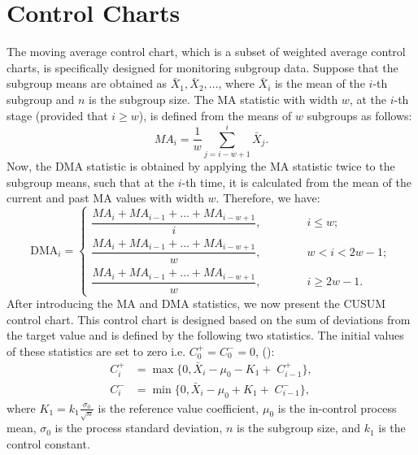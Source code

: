 \documentclass[twoside]{article}
\begin{document}
\section{Control Charts}
\vspace{-0.25cm}
The moving average control chart, which is a subset of weighted average control charts, is specifically designed for monitoring subgroup data. Suppose that the subgroup means are obtained as $\bar{X}_1, \bar{X}_2, \dots$, where $\bar{X}_i$ is the mean of the $i$-th subgroup and $n$ is the subgroup size. The MA statistic with width $w$, at the $i$-th stage (provided that $i \ge w$), is defined from the means of $w$ subgroups as follows:
\begin{equation}
MA_i = \frac{1}{w} \sum_{j=i-w+1}^{i} \bar{X}_j.
\label{ma}
\end{equation}
Now, the DMA statistic is obtained by applying the MA statistic twice to the subgroup means, such that at the $i$-th time, it is calculated from the mean of the current and past MA values with width $w$. Therefore, we have:
\begin{equation}   
\text{DMA}_{i} =
\begin{cases} 
\dfrac{MA_i + MA_{i-1} + \dots + MA_{i-w+1}}{i}, \qquad \qquad i \le w ; \\
\dfrac{MA_i + MA_{i-1} + \dots + MA_{i-w+1}}{w}, \qquad \qquad w < i < 2w - 1;\\
\dfrac{MA_i + MA_{i-1} + \dots + MA_{i-w+1}}{w}, \qquad \qquad i \ge 2w-1.
\end{cases}
\label{dma}
\end{equation}
After introducing the MA and DMA statistics, we now present the CUSUM control chart. This control chart is designed based on the sum of deviations from the target value and is defined by the following two statistics. The initial values of these statistics are set to zero i.e. $C_0^+ = C_0^- = 0$, (\cite{page1954}):
\begin{equation}
\begin{aligned}
C_i^+ &= \max\{0,  \bar{X}_i - \mu_0 - K_1 + \; C_{i-1}^+  \}, \\
C_i^- &= \min\{0,  \bar{X}_i - \mu_0 + K_1 +\; C_{i-1}^-  \},
\end{aligned}
\label{cusum}
\end{equation}
where $K_1 = k_1 \frac{\sigma_0}{\sqrt{n}}$ is the  reference value coefficient, $\mu_0$ is the in-control process mean, $\sigma_0$ is the process standard deviation, $n$ is the subgroup size, and $k_1$ is the control constant.
\end{document}
